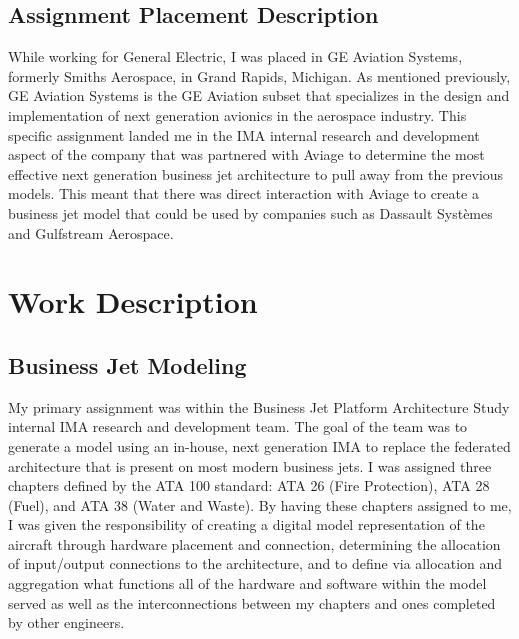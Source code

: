 \documentclass{article}
\begin{document}
\subsection{Assignment Placement Description}
While working for General Electric, I was placed in GE Aviation Systems, formerly Smiths Aerospace, in Grand Rapids, Michigan.
As mentioned previously, GE Aviation Systems is the GE Aviation subset that specializes in the design and implementation of next generation avionics in the aerospace industry.
This specific assignment landed me in the IMA internal research and development aspect of the company that was partnered with Aviage to determine the most effective next generation business jet architecture to pull away from the previous models.
This meant that there was direct interaction with Aviage to create a business jet model that could be used by companies such as Dassault Systèmes and Gulfstream Aerospace.

\section{Work Description}
\subsection{Business Jet Modeling}
My primary assignment was within the Business Jet Platform Architecture Study internal IMA research and development team. The goal of the team was to generate a model using an in-house, next generation IMA to replace the federated architecture that is present on most modern business jets.
I was assigned three chapters defined by the ATA 100 standard: ATA 26 (Fire Protection), ATA 28 (Fuel), and ATA 38 (Water and Waste). By having these chapters assigned to me, I was given the responsibility of creating a digital model representation of the aircraft through hardware placement and connection, determining the allocation of input/output connections to the architecture, and to define via allocation and aggregation what functions all of the hardware and software within the model served as well as the interconnections between my chapters and ones completed by other engineers.
\end{document}
